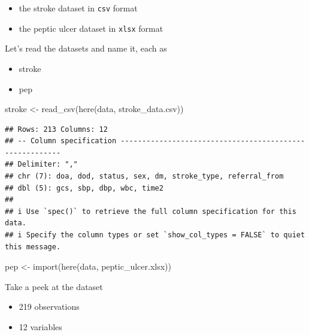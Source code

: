 \documentclass[
  10pt,
]{krantz}
\newenvironment{Shaded}{\begin{snugshade}}{\end{snugshade}}
\newcommand{\FunctionTok}[1]{\textcolor[rgb]{0.00,0.00,0.00}{#1}}
\newcommand{\NormalTok}[1]{#1}
\newcommand{\OtherTok}[1]{\textcolor[rgb]{0.56,0.35,0.01}{#1}}
\newcommand{\StringTok}[1]{\textcolor[rgb]{0.31,0.60,0.02}{#1}}
\providecommand{\tightlist}{%
  \setlength{\itemsep}{0pt}\setlength{\parskip}{0pt}}
\begin{document}
\begin{itemize}
\tightlist
\item
  the stroke dataset in \texttt{csv} format
\item
  the peptic ulcer dataset in \texttt{xlsx} format
\end{itemize}

Let's read the datasets and name it, each as

\begin{itemize}
\tightlist
\item
  stroke
\item
  pep
\end{itemize}

\begin{Shaded}
\begin{Highlighting}[]
\NormalTok{stroke }\OtherTok{\textless{}{-}} \FunctionTok{read\_csv}\NormalTok{(}\FunctionTok{here}\NormalTok{(}\StringTok{\textquotesingle{}data\textquotesingle{}}\NormalTok{, }\StringTok{\textquotesingle{}stroke\_data.csv\textquotesingle{}}\NormalTok{))}
\end{Highlighting}
\end{Shaded}

\begin{verbatim}
## Rows: 213 Columns: 12
## -- Column specification --------------------------------------------------------
## Delimiter: ","
## chr (7): doa, dod, status, sex, dm, stroke_type, referral_from
## dbl (5): gcs, sbp, dbp, wbc, time2
## 
## i Use `spec()` to retrieve the full column specification for this data.
## i Specify the column types or set `show_col_types = FALSE` to quiet this message.
\end{verbatim}

\begin{Shaded}
\begin{Highlighting}[]
\NormalTok{pep }\OtherTok{\textless{}{-}} \FunctionTok{import}\NormalTok{(}\FunctionTok{here}\NormalTok{(}\StringTok{\textquotesingle{}data\textquotesingle{}}\NormalTok{, }\StringTok{\textquotesingle{}peptic\_ulcer.xlsx\textquotesingle{}}\NormalTok{))}
\end{Highlighting}
\end{Shaded}

Take a peek at the dataset

\begin{itemize}
\tightlist
\item
  219 observations
\item
  12 variables
\end{itemize}
\end{document}
